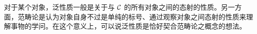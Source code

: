 对于某个对象，泛性质一般是关于与 $\mathcal{C}$ 的所有对象之间的态射的性质。另一方面，范畴论是认为对象自身不过是单纯的标号、通过观察对象之间态射的性质来理解事物的学问。在这个意义上，可以说泛性质是恰好契合范畴论之概念的想法。

